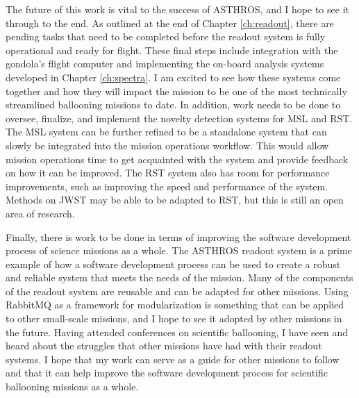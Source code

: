 The future of this work is vital to the success of ASTHROS, and I hope to see it through to the end.
As outlined at the end of Chapter \ref{ch:readout}, there are pending tasks that need to be completed before the readout system is fully operational and ready for flight.
These final steps include integration with the gondola's flight computer and implementing the on-board analysis systems developed in Chapter \ref{ch:spectra}.
I am excited to see how these systems come together and how they will impact the mission to be one of the most technically streamlined ballooning missions to date.
In addition, work needs to be done to oversee, finalize, and implement the novelty detection systems for MSL and RST.
The MSL system can be further refined to be a standalone system that can slowly be integrated into the mission operations workflow.
This would allow mission operations time to get acquainted with the system and provide feedback on how it can be improved.
The RST system also has room for performance improvements, such as improving the speed and performance of the system.
Methods on JWST may be able to be adapted to RST, but this is still an open area of research.

Finally, there is work to be done in terms of improving the software development process of science missions as a whole.
The ASTHROS readout system is a prime example of how a software development process can be used to create a robust and reliable system that meets the needs of the mission.
Many of the components of the readout system are reusable and can be adapted for other missions.
Using RabbitMQ as a framework for modularization is something that can be applied to other small-scale missions, and I hope to see it adopted by other missions in the future.
Having attended conferences on scientific ballooning, I have seen and heard about the struggles that other missions have had with their readout systems.
I hope that my work can serve as a guide for other missions to follow and that it can help improve the software development process for scientific ballooning missions as a whole.
